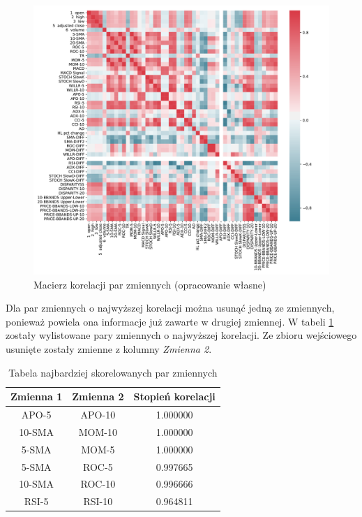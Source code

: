 \documentclass[a4paper, twoside, 11pt, openright]{article}
\begin{document}
\begin{figure}[H]
\centering 
\includegraphics[scale=0.6]{img/corr_matrix.pdf}
\caption{Macierz korelacji par zmiennych (opracowanie własne)}
\label{img:correlation}
\end{figure}

Dla par zmiennych o najwyższej korelacji można usunąć jedną ze zmiennych, ponieważ powiela ona informacje już zawarte w drugiej zmiennej.  W tabeli \ref{tab:ccorr_table1} zostały wylistowane pary zmiennych o najwyższej korelacji. Ze zbioru wejściowego usunięte zostały zmienne z kolumny \textit{Zmienna 2}.


\begin{table}[H]
\centering
\begin{tabular}{ |c|c|c| } 
 \hline
Zmienna 1 & Zmienna 2 &  Stopień korelacji \\
 \hline
APO-5 & APO-10 &  1.000000 \\
 \hline
10-SMA & MOM-10 &  1.000000 \\
 \hline
5-SMA & MOM-5 &  1.000000 \\
 \hline
5-SMA & ROC-5 &  0.997665 \\
 \hline
10-SMA & ROC-10 &  0.996666 \\
 \hline
RSI-5 & RSI-10 &  0.964811 \\  
 \hline
\end{tabular}
\caption{Tabela najbardziej skorelowanych par zmiennych}
\label{tab:ccorr_table1}
\end{table}
\end{document}
